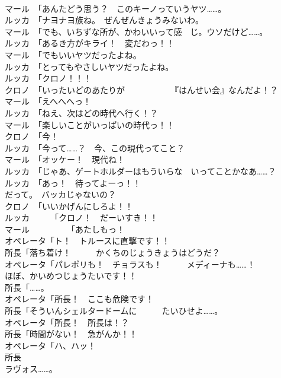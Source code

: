 \documentclass[8pt]{extreport}
\begin{document}
\begin{CJK}{UTF8}{min}
\\	マール　「あんたどう思う？　このキーノっていうヤツ……。	
\\	ルッカ　「ナヨナヨ族ね。　ぜんぜんきょうみないわ。	
\\	マール　「でも、いちずな所が、かわいいって感　じ。ウソだけど……。	
\\	ルッカ　「あるき方がキライ！　変だわっ！！	
\\	マール　「でもいいヤツだったよね。	
\\	ルッカ　「とってもやさしいヤツだったよね。	
\\	ルッカ　「クロノ！！！	
\\	クロノ　「いったいどのあたりが　　　　　　『はんせい会』なんだよ！？	
\\	マール　「えへへへっ！	
\\	ルッカ　「ねえ、次はどの時代へ行く！？	
\\	マール　「楽しいことがいっぱいの時代っ！！	
\\	クロノ　「今！	
\\	ルッカ　「今って……？　今、この現代ってこと？	
\\	マール　「オッケー！　現代ね！	
\\	ルッカ　「じゃあ、ゲートホルダーはもういらな　いってことかなあ……？	
\\	ルッカ　「あっ！　待ってよーっ！！	
\\	だって。　バッカじゃないの？	
\\	クロノ　「いいかげんにしろよ！！	
\\	ルッカ　　　「クロノ！　だーいすき！！	
\\	マール　　　　　「あたしもっ！	
\\	オペレータ「ト！　トルースに直撃です！！	
\\	所長「落ち着け！　　　かくちのじょうきょうはどうだ？	
\\	オペレータ「パレポリも！　チョラスも！　　　メディーナも……！	
\\	ほぼ、かいめつじょうたいです！！	
\\	所長「……。	
\\	オペレータ「所長！　ここも危険です！	
\\	所長「そういんシェルタードームに　　　たいひせよ……。	
\\	オペレータ「所長！　所長は！？	
\\	所長「時間がない！　急がんか！！	
\\	オペレータ「ハ、ハッ！	
\\	所長
\\	ラヴォス……。	
\end{CJK}
\end{document}
